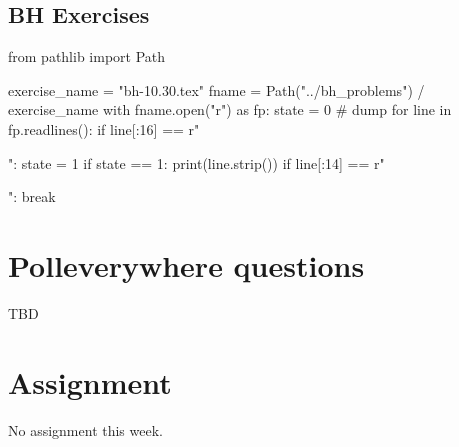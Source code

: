 \subsection{BH Exercises}
\label{sec:bh-exercises-1}


\begin{pycode}
from pathlib import Path

exercise_name = "bh-10.30.tex"
fname = Path("../bh_problems") / exercise_name
with fname.open("r") as fp:
    state = 0  # dump
    for line in fp.readlines():
        if line[:16] == r"\begin{exercise}":
            state = 1
        if state == 1:
            print(line.strip())
        if line[:14] == r"\end{exercise}":
            break
\end{pycode}



\section{Polleverywhere questions}
\label{sec:polev-quest}


TBD


\section{Assignment}
\label{sec:assignment}

No assignment this week.


